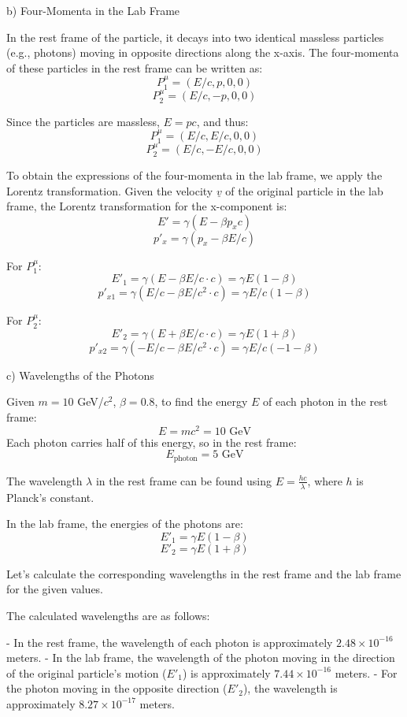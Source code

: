 b) Four-Momenta in the Lab Frame

In the rest frame of the particle, it decays into two identical massless particles (e.g., photons) moving in opposite directions along the x-axis. The four-momenta of these particles in the rest frame can be written as:
\[ P_1^\mu = (E/c, p, 0, 0) \]
\[ P_2^\mu = (E/c, -p, 0, 0) \]

Since the particles are massless, \(E = pc\), and thus:
\[ P_1^\mu = (E/c, E/c, 0, 0) \]
\[ P_2^\mu = (E/c, -E/c, 0, 0) \]

To obtain the expressions of the four-momenta in the lab frame, we apply the Lorentz transformation. Given the velocity \(\underline{v}\) of the original particle in the lab frame, the Lorentz transformation for the x-component is:
\[ E' = \gamma (E - \beta p_x c) \]
\[ p'_x = \gamma (p_x - \beta E/c) \]

For \(P_1^\mu\):
\[ E'_1 = \gamma (E - \beta E/c \cdot c) = \gamma E (1 - \beta) \]
\[ p'_{x1} = \gamma (E/c - \beta E/c^2 \cdot c) = \gamma E/c (1 - \beta) \]

For \(P_2^\mu\):
\[ E'_2 = \gamma (E + \beta E/c \cdot c) = \gamma E (1 + \beta) \]
\[ p'_{x2} = \gamma ( -E/c - \beta E/c^2 \cdot c) = \gamma E/c (-1 - \beta) \]

c) Wavelengths of the Photons

Given \(m = 10\) GeV/\(c^2\), \(\beta = 0.8\), to find the energy \(E\) of each photon in the rest frame:
\[ E = mc^2 = 10 \text{ GeV} \]
Each photon carries half of this energy, so in the rest frame:
\[ E_{\text{photon}} = 5 \text{ GeV} \]

The wavelength \(\lambda\) in the rest frame can be found using \(E = \frac{hc}{\lambda}\), where \(h\) is Planck's constant.

In the lab frame, the energies of the photons are:
\[ E'_{1} = \gamma E (1 - \beta) \]
\[ E'_{2} = \gamma E (1 + \beta) \]

Let's calculate the corresponding wavelengths in the rest frame and the lab frame for the given values.

The calculated wavelengths are as follows:

- In the rest frame, the wavelength of each photon is approximately \(2.48 \times 10^{-16}\) meters.
- In the lab frame, the wavelength of the photon moving in the direction of the original particle's motion (\(E'_1\)) is approximately \(7.44 \times 10^{-16}\) meters.
- For the photon moving in the opposite direction (\(E'_2\)), the wavelength is approximately \(8.27 \times 10^{-17}\) meters.

